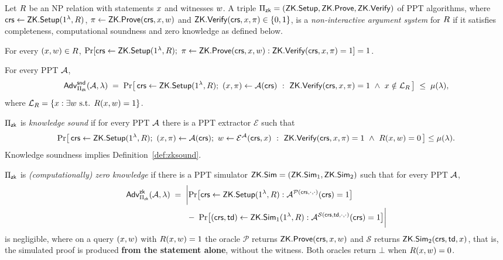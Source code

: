 \begin{definition}
\label{def:nizk}
Let $R$ be an NP relation with statements $x$ and witnesses $w$. A triple
$\Pi_{\mathsf{zk}} = (\mathsf{ZK.Setup}, \mathsf{ZK.Prove}, \mathsf{ZK.Verify})$ of PPT algorithms, where
$\mathsf{crs} \gets \mathsf{ZK.Setup}(1^{\lambda}, R)$, $\pi \gets \mathsf{ZK.Prove}(\mathsf{crs}, x, w)$ and
$\mathsf{ZK.Verify}(\mathsf{crs}, x, \pi) \in \{0,1\}$, is a \emph{non-interactive argument system} for
$R$ if it satisfies completeness, computational soundness and zero knowledge as defined below.
\end{definition}

\begin{definition}[Completeness]
\label{def:zkcomplete}
For every $(x,w) \in R$,
$\Pr[\crs \gets \zkSetup(1^{\secpar},\Rel);\ \zkproof \gets \zkProve(\crs,\stmt,\wit) :
\zkVerify(\crs,\stmt,\zkproof) = 1] = 1$.
\end{definition}

\begin{definition}
\label{def:zksound}
For every PPT $\mathcal{A}$,
\[
\mathsf{Adv}^{\mathsf{snd}}_{\Pi_{\mathsf{zk}}}(\mathcal{A},\lambda) \;=\;
\Pr\bigl[\,\mathsf{crs} \gets \mathsf{ZK.Setup}(1^{\lambda},R);\ (x,\pi) \gets \mathcal{A}(\mathsf{crs})\ :\
\mathsf{ZK.Verify}(\mathsf{crs},x,\pi) = 1 \ \wedge\ x \notin \mathcal{L}_{R}\,\bigr]
\;\le\; \mu(\lambda),
\]
where $\mathcal{L}_{R} = \{x : \exists w \text{ s.t. } R(x,w) = 1\}$.
\end{definition}

\begin{definition}
\label{def:zkksound}
$\Pi_{\mathsf{zk}}$ is \emph{knowledge sound} if for every PPT $\mathcal{A}$ there is a PPT extractor $\mathcal{E}$
such that
\[
\Pr\bigl[\,\mathsf{crs} \gets \mathsf{ZK.Setup}(1^{\lambda},R);\ (x,\pi) \gets \mathcal{A}(\mathsf{crs});\
w \gets \mathcal{E}^{\mathcal{A}}(\mathsf{crs},x)\ :\
\mathsf{ZK.Verify}(\mathsf{crs},x,\pi) = 1 \ \wedge\ R(x,w) = 0\,\bigr] \le \mu(\lambda).
\]
Knowledge soundness implies Definition~\ref{def:zksound}.
\end{definition}

\begin{definition}
\label{def:zk}
$\Pi_{\mathsf{zk}}$ is \emph{(computationally) zero knowledge} if there is a PPT simulator
$\mathsf{ZK.Sim} = (\mathsf{ZK.Sim}_1, \mathsf{ZK.Sim}_2)$ such that for every PPT $\mathcal{A}$,
\begin{align*}
  \mathsf{Adv}^{\mathsf{zk}}_{\Pi_{\mathsf{zk}}}(\mathcal{A},\lambda) &\;=\; \biggl| \Pr\bigl[\mathsf{crs} \gets \mathsf{ZK.Setup}(1^{\lambda},R) : \mathcal{A}^{\mathcal{P}(\mathsf{crs},\cdot,\cdot)}(\mathsf{crs}) = 1\bigr] \\
  &\qquad -\; \Pr\bigl[(\mathsf{crs},\mathsf{td}) \gets \mathsf{ZK.Sim}_1(1^{\lambda},R) : \mathcal{A}^{\mathcal{S}(\mathsf{crs},\mathsf{td},\cdot,\cdot)}(\mathsf{crs}) = 1\bigr] \biggr|
\end{align*}
is negligible, where on a query $(x,w)$ with $R(x,w)=1$ the oracle
$\mathcal{P}$ returns $\mathsf{ZK.Prove}(\mathsf{crs},x,w)$ and $\mathcal{S}$ returns
$\mathsf{ZK.Sim}_2(\mathsf{crs},\mathsf{td},x)$,  that is, the simulated proof is produced \textbf{from the statement
alone}, without the witness. Both oracles return $\bot$ when $R(x,w) = 0$.
\end{definition}

